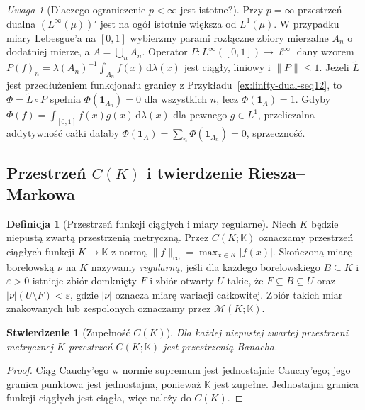 \documentclass[11pt,a4paper]{article}
\numberwithin{equation}{section}
\theoremstyle{plain}
\newtheorem{stwierdzenie}[twierdzenie]{Stwierdzenie}
\theoremstyle{definition}
\newtheorem{definicja}[twierdzenie]{Definicja}
\theoremstyle{remark}
\newtheorem{uwaga}[twierdzenie]{Uwaga}
\newcommand{\K}{\mathbb K}
\begin{document}
\begin{uwaga}[Dlaczego ograniczenie $p<\infty$ jest istotne?]
\label{rem:linfty-dual12}
Przy $p=\infty$ przestrzeń dualna $(L^\infty(\mu))'$ jest
na ogół istotnie większa od $L^1(\mu)$. W przypadku miary
Lebesgue'a na $[0,1]$ wybierzmy parami rozłączne zbiory mierzalne
$A_n$ o dodatniej mierze, a $A=\bigcup_nA_n$. Operator
$P:L^\infty([0,1])\to\ell^\infty$ dany wzorem
$P(f)_n=\lambda(A_n)^{-1}\int_{A_n}f(x)\,\mathrm d\lambda(x)$
jest ciągły, liniowy i $\|P\|\le1$.
Jeżeli $\widetilde L$ jest przedłużeniem funkcjonału granicy
z Przykładu~\ref{ex:linfty-dual-seq12}, to $\Phi=\widetilde L\circ P$
spełnia $\Phi(\mathbf1_{A_n})=0$ dla wszystkich $n$, lecz
$\Phi(\mathbf1_A)=1$.
Gdyby $\Phi(f)=\int_{[0,1]}f(x)g(x)\,\mathrm d\lambda(x)$
dla pewnego $g\in L^1$, przeliczalna addytywność całki dałaby
$\Phi(\mathbf1_A)=\sum_n\Phi(\mathbf1_{A_n})=0$, sprzeczność.
\end{uwaga}

\subsection{Przestrzeń \texorpdfstring{$C(K)$}{C(K)} i twierdzenie Riesza--Markowa}

\begin{definicja}[Przestrzeń funkcji ciągłych i miary regularne]
\label{def:ck-measures12}
Niech $K$ będzie niepustą zwartą przestrzenią metryczną.
Przez $C(K;\K)$ oznaczamy przestrzeń ciągłych funkcji
$K\to\K$ z normą $\|f\|_\infty=\max_{x\in K}|f(x)|$.
Skończoną miarę borelowską $\nu$ na $K$ nazywamy
\emph{regularną}, jeśli dla każdego borelowskiego $B\subseteq K$
i $\varepsilon>0$ istnieje zbiór domknięty $F$ i zbiór otwarty
$U$ takie, że $F\subseteq B\subseteq U$ oraz
$|\nu|(U\setminus F)<\varepsilon$, gdzie $|\nu|$ oznacza
miarę wariacji całkowitej. Zbiór takich miar znakowanych
lub zespolonych oznaczamy przez $\mathcal M(K;\K)$.
\end{definicja}

\begin{stwierdzenie}[Zupełność $C(K)$]
\label{prop:ck-banach12}
Dla każdej niepustej zwartej przestrzeni metrycznej $K$
przestrzeń $C(K;\K)$ jest przestrzenią Banacha.
\end{stwierdzenie}
\begin{proof}
Ciąg Cauchy'ego w normie supremum jest jednostajnie Cauchy'ego;
jego granica punktowa jest jednostajna, ponieważ $\K$ jest zupełne.
Jednostajna granica funkcji ciągłych jest ciągła, więc należy do $C(K)$.
\end{proof}
\end{document}
